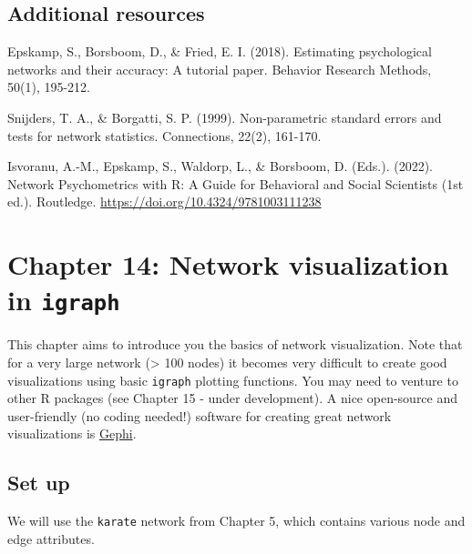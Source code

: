 \documentclass[
]{book}
\newenvironment{Shaded}{\begin{snugshade}}{\end{snugshade}}
\newcommand{\AttributeTok}[1]{\textcolor[rgb]{0.13,0.29,0.53}{#1}}
\newcommand{\CommentTok}[1]{\textcolor[rgb]{0.56,0.35,0.01}{\textit{#1}}}
\newcommand{\FunctionTok}[1]{\textcolor[rgb]{0.13,0.29,0.53}{\textbf{#1}}}
\newcommand{\NormalTok}[1]{#1}
\newcommand{\OtherTok}[1]{\textcolor[rgb]{0.56,0.35,0.01}{#1}}
\newcommand{\SpecialCharTok}[1]{\textcolor[rgb]{0.81,0.36,0.00}{\textbf{#1}}}
\newcommand{\StringTok}[1]{\textcolor[rgb]{0.31,0.60,0.02}{#1}}
\begin{document}
\section{Additional resources}\label{additional-resources}

Epskamp, S., Borsboom, D., \& Fried, E. I. (2018). Estimating psychological networks and their accuracy: A tutorial paper. Behavior Research Methods, 50(1), 195-212.

Snijders, T. A., \& Borgatti, S. P. (1999). Non-parametric standard errors and tests for network statistics. Connections, 22(2), 161-170.

Isvoranu, A.-M., Epskamp, S., Waldorp, L., \& Borsboom, D. (Eds.). (2022). Network Psychometrics with R: A Guide for Behavioral and Social Scientists (1st ed.). Routledge. \url{https://doi.org/10.4324/9781003111238}

\chapter{\texorpdfstring{Chapter 14: Network visualization in \texttt{igraph}}{Chapter 14: Network visualization in igraph}}\label{ch14}

This chapter aims to introduce you the basics of network visualization. Note that for a very large network (\textgreater{} 100 nodes) it becomes very difficult to create good visualizations using basic \texttt{igraph} plotting functions. You may need to venture to other R packages (see Chapter 15 - under development). A nice open-source and user-friendly (no coding needed!) software for creating great network visualizations is \href{https://gephi.org/}{Gephi}.

\section{Set up}\label{set-up-3}

We will use the \texttt{karate} network from Chapter 5, which contains various node and edge attributes.

\begin{Shaded}
\end{Shaded}
\end{document}

